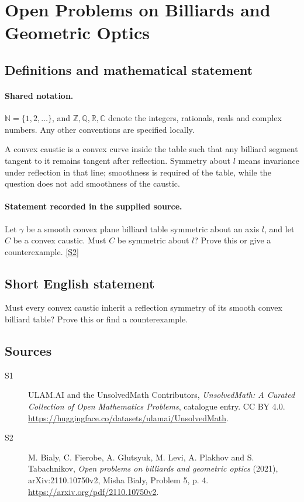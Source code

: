 \documentclass[11pt]{article}
\newcommand{\sref}[2]{\hyperlink{source:#1:#2}{[S#2]}}
\begin{document}
\section{Open Problems on Billiards and Geometric Optics}\label{statement}

\subsection{Definitions and mathematical statement}

\paragraph{Shared notation.}$\mathbb N=\{1,2,\ldots\}$, and $\mathbb Z,\mathbb Q,\mathbb R,\mathbb C$ denote the integers, rationals, reals and complex numbers. Any other conventions are specified locally.


A convex caustic is a convex curve inside the table such that any billiard segment tangent to it remains tangent after reflection. Symmetry about $l$ means invariance under reflection in that line; smoothness is required of the table, while the question does not add smoothness of the caustic.
\paragraph{Statement recorded in the supplied source.}
Let $\gamma$ be a smooth convex plane billiard table symmetric about an axis $l$, and let $C$ be a convex caustic. Must $C$ be symmetric about $l$? Prove this or give a counterexample. \sref{statement}{2}
\subsection{Short English statement}
Must every convex caustic inherit a reflection symmetry of its smooth convex billiard table? Prove this or find a counterexample.
\subsection{Sources}
\begin{description}
\item[\hypertarget{source:statement:1}{S1}] ULAM.AI and the UnsolvedMath Contributors, \emph{UnsolvedMath: A Curated Collection of Open Mathematics Problems}, catalogue entry. CC BY 4.0. \url{https://huggingface.co/datasets/ulamai/UnsolvedMath}.
\item[\hypertarget{source:statement:2}{S2}] M. Bialy, C. Fierobe, A. Glutsyuk, M. Levi, A. Plakhov and S. Tabachnikov, \emph{Open problems on billiards and geometric optics} (2021), arXiv:2110.10750v2, Misha Bialy, Problem 5, p. 4. \url{https://arxiv.org/pdf/2110.10750v2}.
\end{description}
\label{end:statement}
\end{document}
